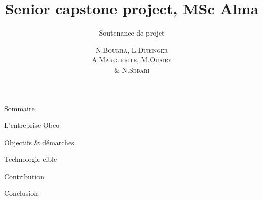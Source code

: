 \documentclass[HeilHazel,pdf,final,colorBG,slideColor]{prosper}
\title{\vspace{-0,5cm}Senior capstone project, MSc Alma}
\subtitle{Soutenance de projet}
\author{N.\textsc{Boukra}, L.\textsc{Duringer}\\
  A.\textsc{Marguerite},  M.\textsc{Ouairy}\\
  \& N.\textsc{Sebari}}
\begin{document}
\maketitle
\newcommand{\bc}{\begin{center}} 
\newcommand{\ec}{\end{center}} 
\newcommand{\bi}{\begin{Itemize}} 
\newcommand{\ei}{\end{Itemize}} 
\newcommand{\myitemm}{\item \texttt{[image: green-bullet-on-white]}}
\newcommand{\icongb}{\texttt{[image: green-bullet-on-white]}} 
\newcommand{\iconrb}{\texttt{[image: red-bullet-on-white]}} 

\newcommand{\itemg}{\item[\icongb{}]}
\newcommand{\itemr}{\item[\iconrb{}]}


\begin{slide}{Sommaire}
  \begin{enumerate}
    {\bf
    \item L'entreprise Obeo
      \vspace{.5cm}
    \item Objectifs \& démarches
      \vspace{.5cm}
    \item Technologie cible  
      \vspace{.5cm}
    \item Contribution
      \vspace{.5cm}
    \item Conclusion}
  \end{enumerate}
\end{slide}
\end{document}
